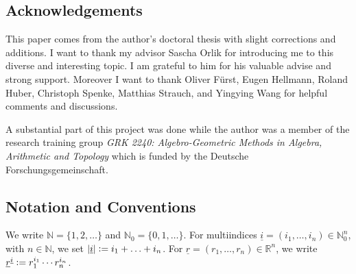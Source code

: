 \documentclass[a4paper, reqno, 10pt]{amsart}
\theoremstyle{definition}
\numberwithin{equation}{section}
\newcommand{\abs}[1]{{\lvert{#1}\rvert}}
\newcommand{\botimes}[1]{{\,\otimes_{#1}\,}}
\newcommand{\cotimes}[1]{{\,\widehat{\otimes}_{#1}\,}}
\newcommand{\defeq}{\vcentcolon=}
\newcommand{\projcotimes}{{\,\widehat{\otimes}_{K,\pi}\,}}
\newcommand{\ul}[1]{{\underline{#1}}}
\newcommand{\BN}{{\mathbb {N}}}
\newcommand{\BR}{{\mathbb {R}}}
\newcommand{\CO}{{\mathcal {O}}}
\newcommand{\bG}{{\mathrm{\bf G}}}
\newcommand{\bP}{{\mathrm{\bf P}}}
\newcommand{\Fg}{{\mathfrak {g}}}
\newcommand{\Fp}{{\mathfrak {p}}}
\newcommand{\alg}{{\mathrm{alg}}}
\begin{document}









\subsection*{Acknowledgements}

This paper comes from the author's doctoral thesis with slight corrections and additions.
I want to thank my advisor Sascha Orlik for introducing me to this diverse and interesting topic.
I am grateful to him for his valuable advise and strong support.
Moreover I want to thank Oliver Fürst, Eugen Hellmann, Roland Huber, Christoph Spenke, Matthias Strauch, and Yingying Wang for helpful comments and discussions.


A substantial part of this project was done while the author was a member of the research training group \textit{GRK 2240: Algebro-Geometric Methods in Algebra, Arithmetic and Topology} which is funded by the Deutsche Forschungsgemeinschaft.


\subsection*{Notation and Conventions}

We write $\BN = \{1,2,\ldots \}$ and $\BN_0 = \{0,1,\ldots\}$.
For multiindices $\ul{i}= (i_1,\ldots,i_n) \in \BN^n_0$, with $n\in \BN$, we set $\abs{\ul{i}}\defeq i_1+\ldots +i_n$.
For $\ul{r} = (r_1,\ldots,r_n) \in \BR^n$, we write $\ul{r}^\ul{i} \defeq r_1^{i_1} \cdots r_n^{i_n}$.
\end{document}
